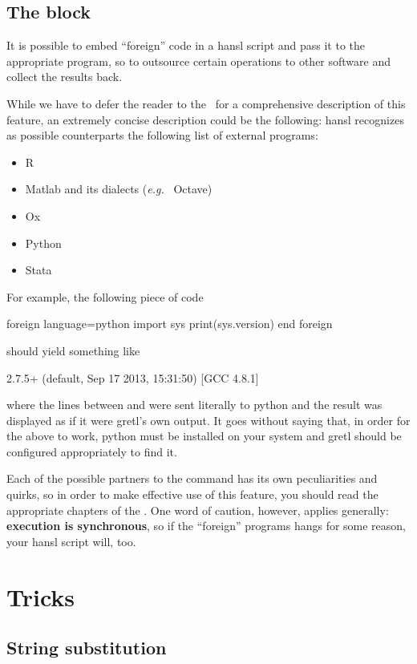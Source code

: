 \subsection{The  block}

It is possible to embed ``foreign'' code in a hansl script and pass it
to the appropriate program, so to outsource certain operations to
other software and collect the results back.

While we have to defer the reader to the \GUG\ for a comprehensive
description of this feature, an extremely concise description could be
the following: hansl recognizes as possible counterparts the following
list of external programs:
\begin{itemize}
\item R
\item Matlab and its dialects (\emph{e.g.}~ Octave)
\item Ox
\item Python
\item Stata
\end{itemize}

For example, the following piece of code
\begin{code}
foreign language=python
	import sys
	print(sys.version)
end foreign
\end{code}
should yield something like
\begin{code}
2.7.5+ (default, Sep 17 2013, 15:31:50) 
[GCC 4.8.1]
\end{code}
where the lines between  and  were sent
literally to python and the result was displayed as if it were gretl's
own output. It goes without saying that, in order for the above to
work, python must be installed on your system and gretl should be
configured appropriately to find it.

Each of the possible partners to the  command has its own
peculiarities and quirks, so in order to make effective use of this
feature, you should read the appropriate chapters of the \GUG. One
word of caution, however, applies generally: \textbf{execution is
  synchronous}, so if the ``foreign'' programs hangs for some reason,
your hansl script will, too. 
\section{Tricks}
\subsection{String substitution}
\label{sec:stringsub}

